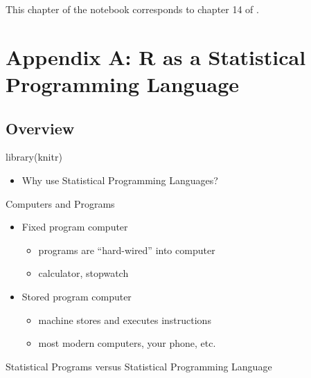 \documentclass[
]{book}
\newenvironment{Shaded}{\begin{snugshade}}{\end{snugshade}}
\newcommand{\FunctionTok}[1]{\textcolor[rgb]{0.00,0.00,0.00}{#1}}
\newcommand{\NormalTok}[1]{#1}
\providecommand{\tightlist}{%
  \setlength{\itemsep}{0pt}\setlength{\parskip}{0pt}}
\begin{document}
This chapter of the notebook corresponds to chapter 14 of \citet{judd2017data}.

\hypertarget{appendix-appendices}{%
\appendix}


\hypertarget{RSPL}{%
\chapter{Appendix A: R as a Statistical Programming Language}\label{RSPL}}

\hypertarget{overview}{%
\section{Overview}\label{overview}}

\begin{Shaded}
\begin{Highlighting}[]
\FunctionTok{library}\NormalTok{(knitr)}
\end{Highlighting}
\end{Shaded}

\begin{itemize}
\tightlist
\item
  Why use Statistical Programming Languages?
\end{itemize}

Computers and Programs

\begin{itemize}
\tightlist
\item
  Fixed program computer

  \begin{itemize}
  \tightlist
  \item
    programs are ``hard-wired'' into computer
  \item
    calculator, stopwatch
  \end{itemize}
\item
  Stored program computer

  \begin{itemize}
  \tightlist
  \item
    machine stores and executes instructions
  \item
    most modern computers, your phone, etc.
  \end{itemize}
\end{itemize}

Statistical Programs versus Statistical Programming Language
\end{document}
